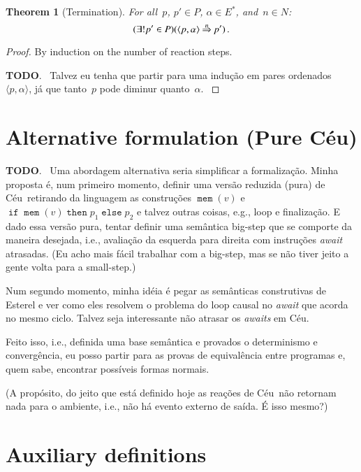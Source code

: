 \documentclass[11pt,a4paper,oneside]{amsart}
\makeatletter
\def\FIXME#1{{\color{red}{\textbf{#1}}}}
\newenvironment{TODO}
  {\bigskip\bgroup\color{red}\textbf{TODO}.~}
  {\egroup\bigskip}
\theoremstyle{plain}
\newtheorem{thm}{Theorem}
\theoremstyle{definition}
\theoremstyle{remark}
\def\Ceu{C\'eu}
\def\<#1>{\langle#1\rangle}
\def\@raise#1#2#3{
  \setbox0=\hbox{#1}%
  \mathbin{%
    \hbox to\wd0{%
      \rlap{\box0}\hfill\raise#2\hbox{$\scriptstyle{#3}$}\hfill
    }%
  }%
}
\def\eval#1{\@raise{$\Rightarrow$}{1.1ex}{#1}}
\def\@ceuop#1{\mathop{\texttt{#1}}}%
\def\@ceubin#1{\mathbin{\texttt{#1}}}%
\def\ceu#1{%
  \bgroup
  \def\Skip{\@ceuop{skip}}%
  \def\Mem{\@ceuop{mem}}%
  \def\Await{\@ceuop{await}}%
  \def\Emit{\@ceuop{emit}}%
  \def\Break{\@ceuop{break}}%
  \def\Ifelse##1##2##3{%
    \@ceuop{if}%
    \@ceuop{mem}(##1)%
    \@ceuop{then}{##2}%
    \@ceuop{else}{##3}}%
  \def\Loop{\@ceuop{loop}}%
  \def\And{\@ceubin{and}}%
  \def\Or{\@ceubin{or}}%
  \def\Fin{\@ceuop{fin}}%
  \def\Awaiting{\@ceuop{@awaiting}}%
  \def\Emitting{\@ceuop{@emitting}}%
  \def\Atloop{\@ceuop{@loop}}%
  \ensuremath{#1}\ignorespaces
  \egroup
}
\makeatother
\begin{document}
\begin{thm}[Termination]
For all~$p$, $p'\in{P}$, $\alpha\in{E^*}$, and~$n\in{N}$:
\begin{equation*}
(\exists!p'\in{P})(\<p,\alpha>\eval{n}p')\,.
\end{equation*}
\end{thm}
\begin{proof}
By induction on the number of reaction steps.  \FIXME{\dots}

\begin{TODO}
  Talvez eu tenha que partir para uma indução em pares
  ordenados~$\<p,\alpha>$, já que tanto~$p$ pode diminur quanto~$\alpha$.
\end{TODO}
\end{proof}


\section{Alternative formulation (Pure \Ceu)}
\label{Section:pure-ceu}

\begin{TODO}
Uma abordagem alternativa seria simplificar a formalização.  Minha proposta
é, num primeiro momento, definir uma versão reduzida (pura) de
\Ceu\ retirando da linguagem as construções \ceu{\Mem(v)} e
\ceu{\Ifelse{v}{p_1}{p_2}} e talvez outras coisas, e.g., loop e finalização.
E dado essa versão pura, tentar definir uma semântica big-step que se
comporte da maneira desejada, i.e., avaliação da esquerda para direita com
instruções \emph{await} atrasadas.  (Eu acho mais fácil trabalhar com a
big-step, mas se não tiver jeito a gente volta para a small-step.)

Num segundo momento, minha idéia é pegar as semânticas construtivas de
Esterel e ver como eles resolvem o problema do loop causal no \emph{await}
que acorda no mesmo ciclo.  Talvez seja interessante não atrasar os
\emph{awaits} em \Ceu.

Feito isso, i.e., definida uma base semântica e provados o determinismo e
convergência, eu posso partir para as provas de equivalência entre programas
e, quem sabe, encontrar possíveis formas normais.

(A propósito, do jeito que está definido hoje as reações de \Ceu\ não
retornam nada para o ambiente, i.e., não há evento externo de saída.  É isso
mesmo?)
\end{TODO}


\appendix
\section{Auxiliary definitions}
\label{Appendix:extra}
\end{document}
